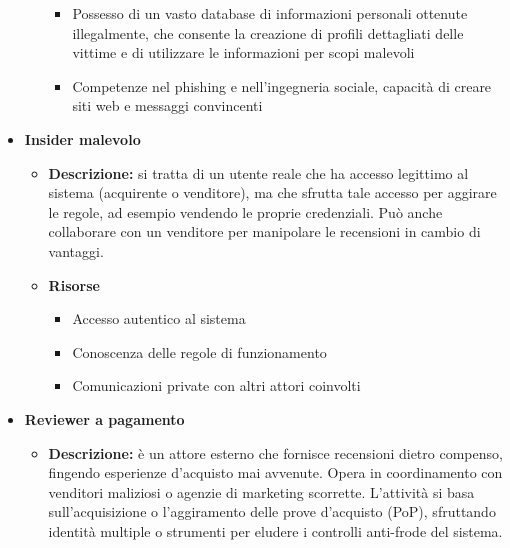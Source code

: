 \begin{itemize}
\begin{itemize}
\begin{itemize}
                            \item Possesso di un vasto database di informazioni personali ottenute illegalmente, che consente la creazione di profili dettagliati delle vittime e di utilizzare le informazioni per scopi malevoli
    
                            \item Competenze nel phishing e nell'ingegneria sociale, capacità di creare siti web e messaggi convincenti
                        \end{itemize}
                \end{itemize}
    
            \item \textbf{Insider malevolo}
                \begin{itemize}                    
                    \item \textbf{Descrizione:} si tratta di un utente reale che ha accesso legittimo al sistema (acquirente o venditore), ma che sfrutta tale accesso per aggirare le regole, ad esempio vendendo le proprie credenziali. Può anche collaborare con un venditore per manipolare le recensioni in cambio di vantaggi.
                    
                    \item \textbf{Risorse}
                        \begin{itemize}
                            \item Accesso autentico al sistema
        
                            \item Conoscenza delle regole di funzionamento
        
                            \item Comunicazioni private con altri attori coinvolti
                        \end{itemize}
                \end{itemize}
    
            \item \textbf{Reviewer a pagamento}
                \begin{itemize}                    
                    \item \textbf{Descrizione:}  è un attore esterno che fornisce recensioni dietro compenso, fingendo esperienze d'acquisto mai avvenute. Opera in coordinamento con venditori maliziosi o agenzie di marketing scorrette. L'attività si basa sull'acquisizione o l'aggiramento delle prove d'acquisto (PoP), sfruttando identità multiple o strumenti per eludere i controlli anti-frode del sistema.
                    

\end{itemize}
\end{itemize}
